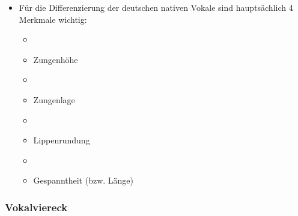 
\begin{frame}

	\begin{itemize}
		\item Für die Differenzierung der deutschen nativen Vokale sind hauptsächlich 4 Merkmale wichtig:
		
		\begin{itemize}
			\item[]
			\item Zungenhöhe
			\item[]
			\item Zungenlage
			\item[]
			\item Lippenrundung
			\item[]
			\item Gespanntheit (bzw. Länge)
		\end{itemize}
		
	\end{itemize}
	
\end{frame}


%
\subsubsection{Vokalviereck}

